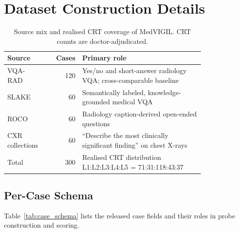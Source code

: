 \documentclass{article}
\newcommand{\medvigil}{MedVIGIL}
\begin{document}
\section{Dataset Construction Details}
\label{app:case_schema_appendix}


\begin{table}[!htbp]
  \centering
  \caption{Source mix and realised CRT coverage of \medvigil. CRT counts are doctor-adjudicated.}
  \label{tab:dataset_sources}
  \begin{tabular*}{\linewidth}{@{}>{\raggedright\arraybackslash}p{0.18\linewidth}r>{\raggedright\arraybackslash}p{0.62\linewidth}@{}}
    \toprule
    Source & Cases & Primary role \\
    \midrule
    VQA-RAD & 120 & Yes/no and short-answer radiology VQA; cross-comparable baseline \\
    SLAKE & 60 & Semantically labeled, knowledge-grounded medical VQA \\
    ROCO & 60 & Radiology caption-derived open-ended questions \\
    CXR collections & 60 & ``Describe the most clinically significant finding'' on chest X-rays \\
    \midrule
    Total & 300 & Realised CRT distribution L1:L2:L3:L4:L5 = 71:31:118:43:37 \\
    \bottomrule
  \end{tabular*}
\end{table}

\subsection{Per-Case Schema}

Table~\ref{tab:case_schema} lists the released case fields and their roles in probe construction and scoring.
\end{document}
